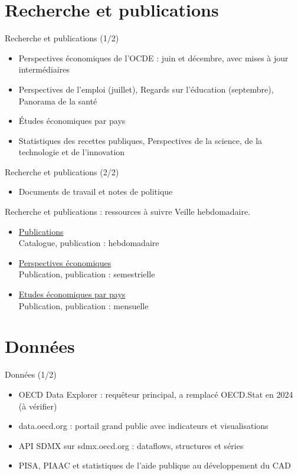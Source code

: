 \documentclass[aspectratio=169,11pt]{beamer}
\begin{document}
\section{Recherche et publications}
\begin{frame}{Recherche et publications (1/2)}
\begin{itemize}
\item Perspectives économiques de l'OCDE : juin et décembre, avec mises à jour intermédiaires
\item Perspectives de l'emploi (juillet), Regards sur l'éducation (septembre), Panorama de la santé
\item Études économiques par pays
\item Statistiques des recettes publiques, Perspectives de la science, de la technologie et de l'innovation
\end{itemize}
\end{frame}

\begin{frame}{Recherche et publications (2/2)}
\begin{itemize}
\item Documents de travail et notes de politique
\end{itemize}
\end{frame}

\begin{frame}{Recherche et publications : ressources à suivre}
\small
Veille hebdomadaire.
\begin{itemize}
\item \href{https://www.oecd.org/en/publications.html}{Publications}\\{\footnotesize Catalogue, publication : hebdomadaire}
\item \href{https://www.oecd.org/en/publications/serials/oecd-economic-outlook_16097408.html}{Perspectives économiques}\\{\footnotesize Publication, publication : semestrielle}
\item \href{https://www.oecd.org/en/publications/serials/oecd-economic-surveys_16097416.html}{Etudes économiques par pays}\\{\footnotesize Publication, publication : mensuelle}
\end{itemize}
\end{frame}

\section{Données}
\begin{frame}{Données (1/2)}
\begin{itemize}
\item OECD Data Explorer : requêteur principal, a remplacé OECD.Stat en 2024 (à vérifier)
\item data.oecd.org : portail grand public avec indicateurs et visualisations
\item API SDMX sur sdmx.oecd.org : dataflows, structures et séries
\item PISA, PIAAC et statistiques de l'aide publique au développement du CAD
\end{itemize}
\end{frame}
\end{document}
